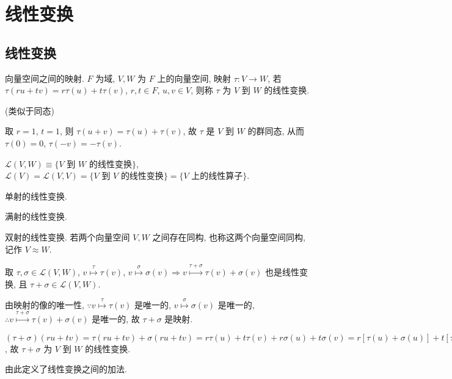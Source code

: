 \documentclass{note}
\begin{document}
\fi
\chapter{线性变换}
\section{线性变换}
\begin{df}[线性变换]
    向量空间之间的映射. $F$ 为域, $V,W$ 为 $F$ 上的向量空间, 映射 $\tau:V\rightarrow W$, 若 $\tau(ru+tv)=r\tau(u)+t\tau(v)$, $r,t\in F$, $u,v\in V$, 则称 $\tau$ 为 $V$ 到 $W$ 的线性变换.
\end{df}
(类似于同态)

取 $r=1$, $t=1$, 则 $\tau(u+v)=\tau(u)+\tau(v)$, 故 $\tau$ 是 $V$ 到 $W$ 的群同态, 从而 $\tau(0)=0$, $\tau(-v)=-\tau(v)$.

$\mathcal{L}(V,W)\equiv\{\text{$V$ 到 $W$ 的线性变换}\}$, $\mathcal{L}(V)=\mathcal{L}(V,V)=\{\text{$V$ 到 $V$ 的线性变换}\}=\{\text{$V$ 上的线性算子}\}$.

\begin{df}[单线性变换]
    单射的线性变换.
\end{df}

\begin{df}[满线性变换]
    满射的线性变换.
\end{df}

\begin{df}[同构]
    双射的线性变换. 若两个向量空间 $V,W$ 之间存在同构, 也称这两个向量空间同构, 记作 $V\approx W$.
\end{df}

取 $\tau,\sigma\in\mathcal{L}(V,W)$, $v\overset{\tau}{\mapsto}\tau(v)$, $v\overset{\sigma}{\mapsto}\sigma(v)\Longrightarrow v\overset{\tau+\sigma}{\mapsto}\tau(v)+\sigma(v)$ 也是线性变换, 且 $\tau+\sigma\in\mathcal{L}(V,W)$.
\begin{pf}
    由映射的像的唯一性, $\because v\overset{\tau}{\mapsto}\tau(v)$ 是唯一的, $v\overset{\sigma}{\mapsto}\sigma(v)$ 是唯一的, $\therefore v\overset{\tau+\sigma}{\mapsto}\tau(v)+\sigma(v)$ 是唯一的, 故 $\tau+\sigma$ 是映射.

    $(\tau+\sigma)(ru+tv)=\tau(ru+tv)+\sigma(ru+tv)=r\tau(u)+t\tau(v)+r\sigma(u)+t\sigma(v)=r[\tau(u)+\sigma(u)]+t[\tau(v)+\sigma(v)]=r[(\tau+\sigma)(u)]+t[(\tau+\sigma)(v)]$, 故 $\tau+\sigma$ 为 $V$ 到 $W$ 的线性变换.
\end{pf}
由此定义了线性变换之间的加法.
\end{document}
